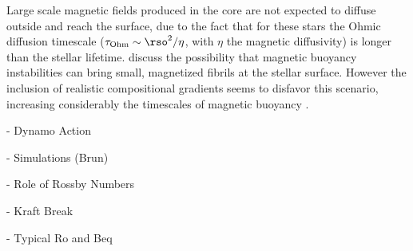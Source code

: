 Large scale magnetic fields produced in the core are not expected to diffuse outside and reach the surface, due to the fact that for these stars the Ohmic diffusion timescale ($\tau_{\rm Ohm}\sim \rso^2/\eta$, with $\eta$ the magnetic diffusivity) is longer than the stellar lifetime. \citet{MacGregor_2003} discuss the possibility that magnetic buoyancy instabilities can bring small, magnetized fibrils at the stellar surface. However the inclusion of realistic compositional gradients seems to disfavor this scenario, increasing considerably the timescales of magnetic buoyancy \citep{MacDonald_2004}.  




- Dynamo Action

- Simulations (Brun)

- Role of Rossby Numbers

- Kraft Break
  
- Typical Ro and Beq   
  
  
  
  
  
  
  
  
  
  
  
  
  
  
  
  
  